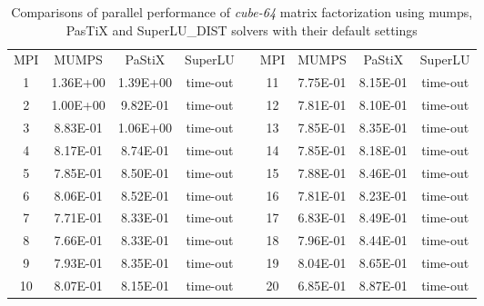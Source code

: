 \begin{table}[ht]
\centering
\begin{tabular}{|c|c|c|c|l|c|c|c|c|}
\cline{1-4} \cline{6-9}
MPI & MUMPS    & PaStiX   & SuperLU  &  & MPI & MUMPS    & PaStiX   & SuperLU  \\ \cline{1-4} \cline{6-9} 
1   & 1.36E+00 & 1.39E+00 & time-out &  & 11  & 7.75E-01 & 8.15E-01 & time-out \\ \cline{1-4} \cline{6-9} 
2   & 1.00E+00 & 9.82E-01 & time-out &  & 12  & 7.81E-01 & 8.10E-01 & time-out \\ \cline{1-4} \cline{6-9} 
3   & 8.83E-01 & 1.06E+00 & time-out &  & 13  & 7.85E-01 & 8.35E-01 & time-out \\ \cline{1-4} \cline{6-9} 
4   & 8.17E-01 & 8.74E-01 & time-out &  & 14  & 7.85E-01 & 8.18E-01 & time-out \\ \cline{1-4} \cline{6-9} 
5   & 7.85E-01 & 8.50E-01 & time-out &  & 15  & 7.88E-01 & 8.46E-01 & time-out \\ \cline{1-4} \cline{6-9} 
6   & 8.06E-01 & 8.52E-01 & time-out &  & 16  & 7.81E-01 & 8.23E-01 & time-out \\ \cline{1-4} \cline{6-9} 
7   & 7.71E-01 & 8.33E-01 & time-out &  & 17  & 6.83E-01 & 8.49E-01 & time-out \\ \cline{1-4} \cline{6-9} 
8   & 7.66E-01 & 8.33E-01 & time-out &  & 18  & 7.96E-01 & 8.44E-01 & time-out \\ \cline{1-4} \cline{6-9} 
9   & 7.93E-01 & 8.35E-01 & time-out &  & 19  & 8.04E-01 & 8.65E-01 & time-out \\ \cline{1-4} \cline{6-9} 
10  & 8.07E-01 & 8.15E-01 & time-out &  & 20  & 6.85E-01 & 8.87E-01 & time-out \\ \cline{1-4} \cline{6-9} 
\end{tabular}
\caption{Comparisons of parallel performance of  \textit{cube-64} matrix factorization using \gls{mumps}, PasTiX and SuperLU\_DIST solvers with their default settings}
\label{table:lc-cube-64-result}
\end{table}


